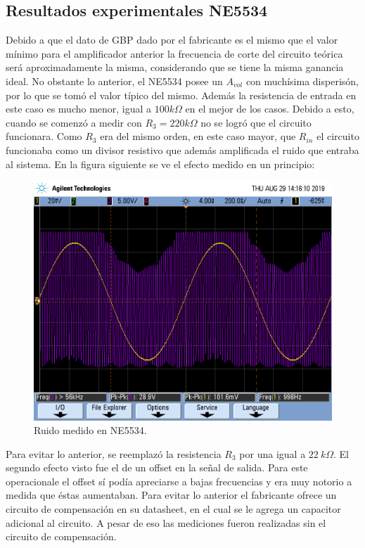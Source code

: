 \subsection{Resultados experimentales NE5534}

Debido a que el dato de GBP dado por el fabricante es el mismo que el valor mínimo para el amplificador anterior la frecuencia de corte del circuito teórica será aproximadamente la misma, considerando que se tiene la misma ganancia ideal. No obstante lo anterior, el NE5534 posee un $A_{vol}$ con muchísima disperisón, por lo que se tomó el valor típico del mismo. Además la resistencia de entrada en este caso es mucho menor, igual a $100k\Omega$ en el mejor de los casos. Debido a esto, cuando se comenzó a medir con $R_3 = 220k\Omega$ no se logró que el circuito funcionara. Como $R_3$ era del mismo orden, en este caso mayor, que $R_{in}$ el circuito funcionaba como un divisor resistivo que además amplificada el ruido que entraba al sistema. En la figura siguiente se ve el efecto medido en un principio:


\begin{figure}[H]	
	\centering
	\includegraphics[width=\textwidth, trim = {0 3.3cm 0 2cm},clip]{Ejercicio2/Imagenes/ruido.png}
	\caption{Ruido medido en NE5534.}
	\label{fig:ruido}
\end{figure}

Para evitar lo anterior, se reemplazó la resistencia $R_3$ por una igual a $22 \ k\Omega$. El segundo efecto visto fue el de un offset en la señal de salida. Para este operacionale el offset sí podía apreciarse a bajas frecuencias y era muy notorio a medida que éstas aumentaban. Para evitar lo anterior el fabricante ofrece un circuito de compensación en su datasheet, en el cual se le agrega un capacitor adicional al circuito. A pesar de eso las mediciones fueron realizadas sin el circuito de compensación.

